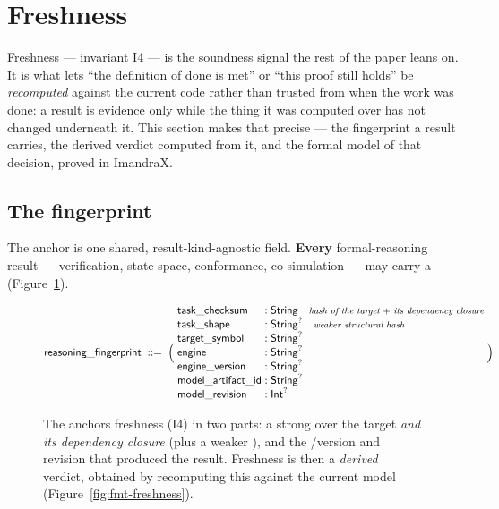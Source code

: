 \section{Freshness}\label{sec:freshness}

Freshness --- invariant I4 --- is the soundness signal the rest of the paper leans on. It is what lets
``the definition of done is met'' or ``this proof still holds'' be \emph{recomputed} against the current
code rather than trusted from when the work was done: a result is evidence only while the thing it was
computed over has not changed underneath it. This section makes that precise --- the fingerprint a result
carries, the derived verdict computed from it, and the formal model of that decision, proved in ImandraX.

\subsection{The fingerprint}\label{sec:freshness-fingerprint}

The anchor is one shared, result-kind-agnostic field. \textbf{Every} formal-reasoning result ---
verification, state-space, conformance, co-simulation --- may carry a 
(Figure~\ref{fig:fmt-fingerprint}).

\begin{figure}[H]
\centering
\small
\[
\id{reasoning\_fingerprint} \;::=\; \Big(\;
\begin{array}{@{}l@{\;:\;}l@{}}
\id{task\_checksum}    & \id{String} \quad\text{\footnotesize\itshape hash of the target $+$ its dependency closure}\\
\id{task\_shape}       & \opt{\id{String}} \quad\text{\footnotesize\itshape weaker structural hash}\\
\id{target\_symbol}    & \opt{\id{String}}\\
\id{engine}            & \opt{\id{String}}\\
\id{engine\_version}   & \opt{\id{String}}\\
\id{model\_artifact\_id} & \opt{\id{String}}\\
\id{model\_revision}   & \opt{\id{Int}}
\end{array}
\;\Big)
\]
\caption{The  anchors freshness (I4) in two parts: a strong  over the target \emph{and its dependency closure} (plus a weaker ), and the /version and  revision that produced the result. Freshness is then a \emph{derived} verdict, obtained by recomputing this against the current model (Figure~\ref{fig:fmt-freshness}).}
\label{fig:fmt-fingerprint}
\end{figure}

